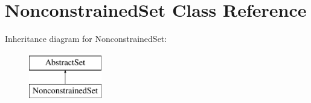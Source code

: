 \hypertarget{classNonconstrainedSet}{\section{Nonconstrained\-Set Class Reference}
\label{classNonconstrainedSet}
}
Inheritance diagram for Nonconstrained\-Set\-:\begin{figure}[H]
\begin{center}
\leavevmode
\includegraphics[height=2.000000cm]{classNonconstrainedSet}
\end{center}
\end{figure}
